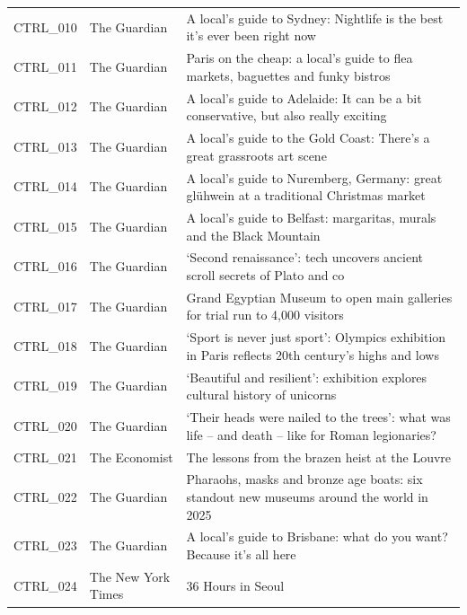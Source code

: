 \begin{longtable}{@{}p{1.5cm}p{2.6cm}p{9.8cm}@{}}
CTRL\_010 & The Guardian & A local’s guide to Sydney: Nightlife is the best it’s ever been right now \\
CTRL\_011 & The Guardian & Paris on the cheap: a local’s guide to flea markets, baguettes and funky bistros \\
CTRL\_012 & The Guardian & A local’s guide to Adelaide: It can be a bit conservative, but also really exciting \\
CTRL\_013 & The Guardian & A local’s guide to the Gold Coast: There’s a great grassroots art scene \\
CTRL\_014 & The Guardian & A local’s guide to Nuremberg, Germany: great glühwein at a traditional Christmas market \\
CTRL\_015 & The Guardian & A local’s guide to Belfast: margaritas, murals and the Black Mountain \\
CTRL\_016 & The Guardian & ‘Second renaissance’: tech uncovers ancient scroll secrets of Plato and co \\
CTRL\_017 & The Guardian & Grand Egyptian Museum to open main galleries for trial run to 4,000 visitors \\
CTRL\_018 & The Guardian & ‘Sport is never just sport’: Olympics exhibition in Paris reflects 20th century’s highs and lows \\
CTRL\_019 & The Guardian & ‘Beautiful and resilient’: exhibition explores cultural history of unicorns \\
CTRL\_020 & The Guardian & ‘Their heads were nailed to the trees’: what was life – and death – like for Roman legionaries? \\
CTRL\_021 & The Economist & The lessons from the brazen heist at the Louvre \\
CTRL\_022 & The Guardian & Pharaohs, masks and bronze age boats: six standout new museums around the world in 2025 \\
CTRL\_023 & The Guardian & A local’s guide to Brisbane: what do you want? Because it’s all here \\
CTRL\_024 & The New York Times & 36 Hours in Seoul \\
\end{longtable}
\endgroup
